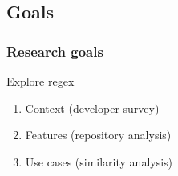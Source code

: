 
\subsection{Goals}

\begin{frame}
\frametitle{Research goals}

\begin{block}{Explore regex}
\begin{enumerate}
\item Context (developer survey)
\item Features (repository analysis)
\item Use cases (similarity analysis)
\end{enumerate}
\end{block}
\end{frame}








%
%
%
%
%

